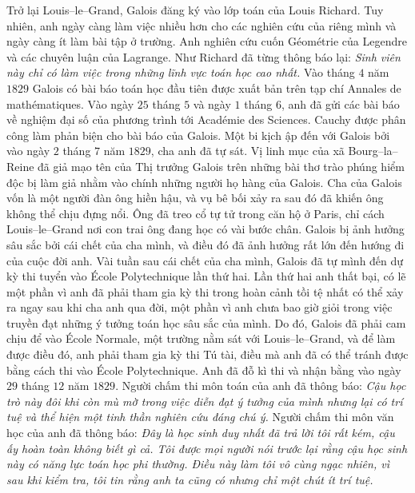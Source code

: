 \begin{multicols}{2}
	\vskip 0.1cm
	Trở lại Louis--le--Grand, Galois đăng ký vào lớp toán của Louis Richard. Tuy nhiên, anh ngày càng làm việc nhiều hơn cho các nghiên cứu của riêng mình và ngày càng ít làm bài tập ở trường. Anh nghiên cứu cuốn Géométrie của Legendre và các chuyên luận của Lagrange. Như Richard đã từng thông báo lại:
	\vskip 0.1cm
	\textit{Sinh viên này chỉ có làm việc trong những lĩnh vực toán học cao nhất.}
	\vskip 0.1cm
	Vào tháng $4$ năm $1829$ Galois có bài báo toán học đầu tiên được xuất bản trên tạp chí Annales de mathématiques. Vào ngày $25$ tháng $5$ và ngày $1$ tháng $6$, anh đã gửi các bài báo về nghiệm đại số của phương trình tới Académie des Sciences. Cauchy được phân công làm phản biện cho bài báo của Galois.
	\vskip 0.1cm
	Một bi kịch ập đến với Galois bởi vào ngày $2$ tháng $7$ năm $1829$, cha anh đã tự sát. Vị linh mục của xã Bourg--la--Reine đã giả mạo tên của Thị trưởng Galois trên những bài thơ trào phúng hiểm độc bị làm giả nhằm vào chính những người họ hàng của Galois. Cha của Galois vốn là một người đàn ông hiền hậu, và vụ bê bối xảy ra sau đó đã khiến ông không thể chịu đựng nổi. Ông đã treo cổ tự tử trong căn hộ ở Paris, chỉ cách Louis--le--Grand nơi con trai ông đang học có vài bước chân. Galois bị ảnh hưởng sâu sắc bởi cái chết của cha mình, và điều đó đã ảnh hưởng rất lớn đến hướng đi của cuộc đời anh.
	\vskip 0.1cm
	Vài tuần sau cái chết của cha mình, Galois đã tự mình đến dự kỳ thi tuyển vào École Polytechnique lần thứ hai. Lần thứ hai anh thất bại, có lẽ một phần vì anh đã phải tham gia kỳ thi trong hoàn cảnh tồi tệ nhất có thể xảy ra ngay sau khi cha anh qua đời, một phần vì anh chưa bao giờ giỏi trong việc truyền đạt những ý tưởng toán học sâu sắc của mình. Do đó, Galois đã phải cam chịu để vào École Normale, một trường nằm sát với  Louis--le--Grand, và để làm được điều đó, anh phải tham gia kỳ thi Tú tài, điều mà anh đã có thể tránh được bằng cách thi vào École Polytechnique.
	\vskip 0.1cm
	Anh đã đỗ kì thi và nhận bằng vào ngày $29$ tháng $12$ năm $1829$. Người chấm thi môn toán của anh đã thông báo: 
	\vskip 0.1cm
	\textit{Cậu học trò này đôi khi còn mù mờ trong việc diễn đạt ý tưởng của mình nhưng lại có trí tuệ và thể hiện một tinh thần nghiên cứu đáng chú ý.}
	\vskip 0.1cm
	Người chấm thi môn văn học của anh đã thông báo: 
	\vskip 0.1cm
	\textit{Đây là học sinh duy nhất đã trả lời tôi rất kém, cậu ấy hoàn toàn không biết gì cả. Tôi được mọi người nói trước lại rằng cậu học sinh này có năng lực toán học phi thường. Điều này làm tôi vô cùng ngạc nhiên, vì sau khi kiểm tra, tôi tin rằng anh ta cũng có nhưng chỉ một chút ít trí tuệ.}

\end{multicols}

